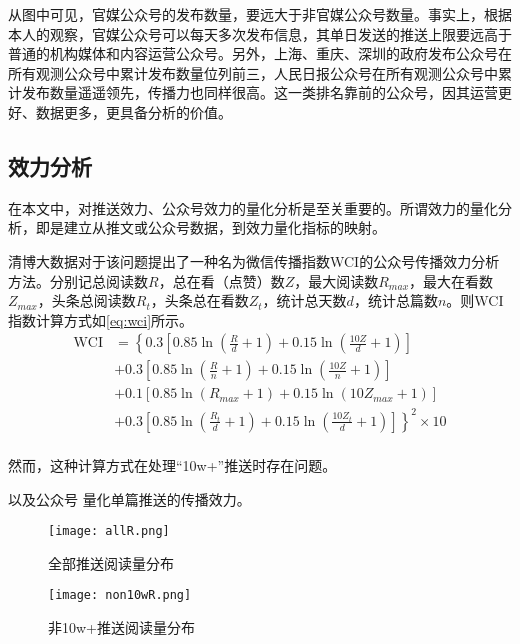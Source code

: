 \documentclass[a4paper,12pt]{article}
\begin{document}
    从图中可见，官媒公众号的发布数量，要远大于非官媒公众号数量。事实上，根据本人的观察，官媒公众号可以每天多次发布信息，其单日发送的推送上限要远高于普通的机构媒体和内容运营公众号。另外，上海、重庆、深圳的政府发布公众号在所有观测公众号中累计发布数量位列前三，人民日报公众号在所有观测公众号中累计发布数量遥遥领先，传播力也同样很高。这一类排名靠前的公众号，因其运营更好、数据更多，更具备分析的价值。
    \subsection{效力分析}
    \label{sub:xiaoli}
    在本文中，对推送效力、公众号效力的量化分析是至关重要的。所谓效力的量化分析，即是建立从推文或公众号数据，到效力量化指标的映射。
    
    清博大数据对于该问题提出了一种名为微信传播指数WCI的公众号传播效力分析方法\cite{清博大数据2020}。分别记总阅读数$R$，总在看（点赞）数$Z$，最大阅读数$R_{max}$，最大在看数$Z_{max}$，头条总阅读数$R_t$，头条总在看数$Z_t$，统计总天数$d$，统计总篇数$n$。则WCI指数计算方式如\cref{eq:wci}所示。
    \begin{equation}
      \label{eq:wci}
      \begin{aligned}
        \text{WCI} &= \left\{ 0.3\left[0.85 \ln (\frac{R}{d} + 1)+ 0.15 \ln (\frac{10Z}{d} + 1)\right] \right. \\
                   &+ 0.3\left[0.85 \ln (\frac{R}{n} + 1)+ 0.15 \ln (\frac{10Z}{n} + 1)\right] \\
                   &+ 0.1\left[0.85 \ln (R_{max} + 1)+ 0.15 \ln (10Z_{max} + 1)\right] \\
                   &\left. + 0.3\left[0.85 \ln (\frac{R_t}{d} + 1)+ 0.15 \ln (\frac{10Z_t}{d} + 1)\right]  \right\} ^ 2 \times 10 \\
      \end{aligned}
    \end{equation}

    然而，这种计算方式在处理“10w+”推送时存在问题。

    以及公众号
    量化单篇推送的传播效力。
    \begin{figure}
      \centering
      \texttt{[image: allR.png]}
      \caption{全部推送阅读量分布}
      \label{fig:allR}
    \end{figure}
    \begin{figure}
      \centering
      \texttt{[image: non10wR.png]}
      \caption{非10w+推送阅读量分布}
      \label{fig:allR}
    \end{figure}
\end{document}
